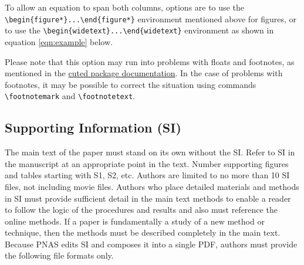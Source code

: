 \documentclass[9pt,twocolumn,twoside]{pnas-new}
\begin{document}
To allow an equation to span both columns, options are to use the \verb|\begin{figure*}...\end{figure*}| environment mentioned above for figures, or to use the \verb|\begin{widetext}...\end{widetext}| environment as shown in equation \ref{eqn:example} below.

Please note that this option may run into problems with floats and footnotes, as mentioned in the \href{http://texdoc.net/pkg/cuted}{cuted package documentation}. In the case of problems with footnotes, it may be possible to correct the situation using commands \verb|\footnotemark| and \verb|\footnotetext|.



\subsection*{Supporting Information (SI)}

The main text of the paper must stand on its own without the SI. Refer to SI in the manuscript at an appropriate point in the text. Number supporting figures and tables starting with S1, S2, etc. Authors are limited to no more than 10 SI files, not including movie files. Authors who place detailed materials and methods in SI must provide sufficient detail in the main text methods to enable a reader to follow the logic of the procedures and results and also must reference the online methods. If a paper is fundamentally a study of a new method or technique, then the methods must be described completely in the main text. Because PNAS edits SI and composes it into a single PDF, authors must provide the following file formats only.
\end{document}
